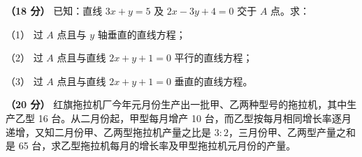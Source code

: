 \begin{question}
\textbf{（18 分）} 已知：直线 $3x+y=5$ 及 $2x-3y+4=0$ 交于 $A$ 点。求：

（1） 过 $A$ 点且与 $y$ 轴垂直的直线方程；

（2） 过 $A$ 点且与直线 $2x+y+1=0$ 平行的直线方程；

（3） 过 $A$ 点且与直线 $2x+y+1=0$ 垂直的直线方程。

\end{question}
\begin{question}
\textbf{（20 分）} 红旗拖拉机厂今年元月份生产出一批甲、乙两种型号的拖拉机，其中生产乙型 16 台。从二月份起，甲型每月增产 10 台，而乙型按每月相同增长率逐月递增，又知二月份甲、乙两型拖拉机产量之比是 $3:2$，三月份甲、乙两型产量之和是 65 台，求乙型拖拉机每月的增长率及甲型拖拉机元月份的产量。

\end{question}